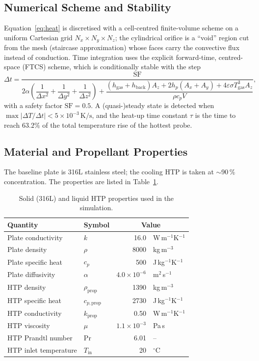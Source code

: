 \documentclass[11pt,a4paper]{article}
\newcommand{\degC}{\ensuremath{^{\circ}}C}
\begin{document}
\subsection{Numerical Scheme and Stability}
Equation~\eqref{eq:heat} is discretised with a cell-centred finite-volume scheme
on a uniform Cartesian grid $N_x\times N_y\times N_z$; the cylindrical orifice is
a ``void'' region cut from the mesh (staircase approximation) whose faces carry
the convective flux instead of conduction. Time integration uses the explicit
forward-time, centred-space (FTCS) scheme, which is conditionally stable with the
step
\begin{equation}
  \Delta t = \frac{\mathrm{SF}}
  {2\alpha\!\left(\dfrac{1}{\Delta x^2}+\dfrac{1}{\Delta y^2}+\dfrac{1}{\Delta z^2}\right)
   + \dfrac{(h_\mathrm{gas}+h_\mathrm{back})A_z + 2h_p(A_x+A_y)
            + 4\varepsilon\sigma T_\mathrm{gas}^3 A_z}{\rho c_p V}},
  \label{eq:dt}
\end{equation}
with a safety factor $\mathrm{SF}=0.5$. A (quasi-)steady state is detected when
$\max|\Delta T/\Delta t| < 5\times10^{-3}\,\mathrm{K/s}$, and the heat-up time
constant $\tau$ is the time to reach $63.2\%$ of the total temperature rise of
the hottest probe.

\subsection{Material and Propellant Properties}
The baseline plate is 316L stainless steel; the cooling HTP is taken at
$\sim$90\,\% concentration. The properties are listed in Table~\ref{tab:props}.

\begin{table}[h]
\centering
\caption{Solid (316L) and liquid HTP properties used in the simulation.}
\label{tab:props}
\begin{tabular}{llr@{ }l}
\toprule
Quantity & Symbol & \multicolumn{2}{c}{Value} \\
\midrule
Plate conductivity    & $k$              & 16.0 & W\,m$^{-1}$K$^{-1}$ \\
Plate density         & $\rho$           & 8000 & kg\,m$^{-3}$ \\
Plate specific heat   & $c_p$            & 500  & J\,kg$^{-1}$K$^{-1}$ \\
Plate diffusivity     & $\alpha$         & $4.0\times10^{-6}$ & m$^2$\,s$^{-1}$ \\
HTP density           & $\rho_\mathrm{prop}$  & 1390 & kg\,m$^{-3}$ \\
HTP specific heat     & $c_{p,\mathrm{prop}}$ & 2730 & J\,kg$^{-1}$K$^{-1}$ \\
HTP conductivity      & $k_\mathrm{prop}$ & 0.50 & W\,m$^{-1}$K$^{-1}$ \\
HTP viscosity         & $\mu$            & $1.1\times10^{-3}$ & Pa\,s \\
HTP Prandtl number    & $\mathrm{Pr}$    & 6.01 & -- \\
HTP inlet temperature & $T_\mathrm{in}$  & 20   & \degC \\
\bottomrule
\end{tabular}
\end{table}
\end{document}
